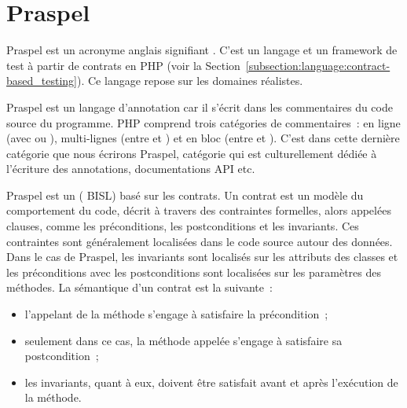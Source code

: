 \def\gsep{$\quad::=\quad$}
\def\mvert{$\;\;|\;\;$}
\newcommand{\gtoken}[1]{\underline{\code{php-#1}}}
\newcommand{\grule}[1]{\textit{#1}}

\section{Praspel}
\label{section:language:praspel}

Praspel est un acronyme anglais signifiant . C'est un langage et un framework de test à partir
de contrats en PHP (voir la
Section~\ref{subsection:language:contract-based_testing}). Ce langage repose sur
les domaines réalistes.

Praspel est un {\strong langage d'annotation} car il s'écrit dans les
commentaires du code source du programme. PHP comprend trois catégories de
commentaires~: en ligne (avec \code{//} ou \code{\#}), multi-lignes (entre
\code{/*} et \code{*/}) et en bloc (entre \code{/**} et \code{*/}). C'est dans
cette dernière catégorie que nous écrirons Praspel, catégorie qui est
culturellement dédiée à l'écriture des annotations, documentations API etc.

Praspel est un  ({\strong
BISL}) basé sur les contrats. Un {\strong contrat} est un modèle du comportement
du code, décrit à travers des contraintes formelles, alors appelées {\strong
clauses}, comme les préconditions, les postconditions et les invariants. Ces
contraintes sont généralement localisées dans le code source autour des données.
Dans le cas de Praspel, les invariants sont localisés sur les attributs des
classes et les préconditions avec les postconditions sont localisées sur les
paramètres des méthodes. La sémantique d'un contrat est la suivante~:

\begin{itemize}

\item l'appelant de la méthode s'engage à satisfaire la précondition~;

\item seulement dans ce cas, la méthode appelée s'engage à satisfaire sa
postcondition~;

\item les invariants, quant à eux, doivent être satisfait avant et après
l'exécution de la méthode.

\end{itemize}

